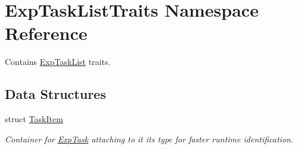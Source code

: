 \hypertarget{namespace_exp_task_list_traits}{}\section{Exp\+Task\+List\+Traits Namespace Reference}
\label{namespace_exp_task_list_traits}


Contains \hyperlink{class_exp_task_list}{Exp\+Task\+List} traits.  


\subsection*{Data Structures}
\begin{DoxyCompactItemize}
\item 
struct \hyperlink{struct_exp_task_list_traits_1_1_task_item}{Task\+Item}
\begin{DoxyCompactList}\small\item\em Container for \hyperlink{class_exp_task}{Exp\+Task} attaching to it its type for faster runtime identification. \end{DoxyCompactList}\end{DoxyCompactItemize}

